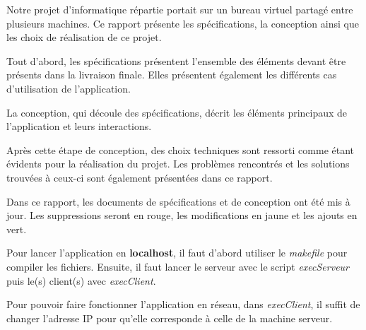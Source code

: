 Notre projet d'informatique répartie portait sur un bureau virtuel partagé entre plusieurs machines. Ce rapport présente les spécifications, la conception ainsi que les choix de réalisation de ce projet.

Tout d'abord, les spécifications présentent l'ensemble des éléments devant être présents dans la livraison finale. Elles présentent également les différents cas d'utilisation de l'application.

La conception, qui découle des spécifications, décrit les éléments principaux de l'application et leurs interactions. 

Après cette étape de conception, des choix techniques sont ressorti comme étant évidents pour la réalisation du projet. Les problèmes rencontrés et les solutions trouvées à ceux-ci sont également présentées dans ce rapport.

Dans ce rapport, les documents de spécifications et de conception ont été mis à jour. Les suppressions seront en rouge, les modifications en jaune et les ajouts en vert.

Pour lancer l'application en \textbf{localhost}, il faut d'abord utiliser le \textit{makefile} pour compiler les fichiers. Ensuite, il faut lancer le serveur avec le script \textit{execServeur} puis le(s) client(s) avec \textit{execClient}. 

Pour pouvoir faire fonctionner l'application en réseau, dans \textit{execClient}, il suffit de changer l'adresse IP pour qu'elle corresponde à celle de la machine serveur.